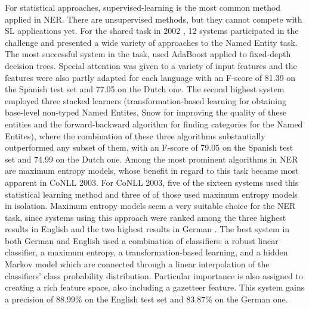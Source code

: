 \documentclass[11pt]{article}
\begin{document}
For statistical approaches, supervised-learning is the most common method applied in NER. 
There are unsupervised methods, but they cannot compete with SL applications yet.
For the shared task in 2002 \cite{tksintro}, 12 systems participated in the challenge and presented a wide variety of approaches to the Named Entity task.
The most successful system in the task, used AdaBoost applied to fixed-depth decision trees. Special attention was given to a variety of input features and the features were also
partly adapted for each language with an F-score of 81.39 on the Spanish test set and 77.05 on the Dutch one.
The second highest system \cite{Florian:2002:NER:1118853.1118863} employed three stacked
learners (transformation-based learning for obtaining base-level non-typed Named Entites, Snow for improving the quality of these entities and the forward-backward algorithm for
finding categories for the Named Entites), where the combination of these three algorithms substantially outperformed any subset of them, with an F-score of 79.05 on the Spanish test
set and 74.99 on the Dutch one.
Among the most prominent algorithms in NER are maximum entropy models, whose benefit in regard to this task became most apparent in CoNLL 2003. 
For CoNLL 2003, five of the sixteen systems used this statistical learning method and three of of those used maximum entropy models in isolation.
Maximum entropy models seem a very suitable choice for the NER task, since systems using this approach were ranked among the three highest results in 
English and the two highest results in German \cite{TjongKimSang:2003:ICS:1119176.1119195}.
The best system in both German and English \cite{Florian:2003:NER:1119176.1119201} used a combination of classifiers: a robust linear classifier, 
a maximum entropy, a transformation-based learning, and a hidden Markov model which are connected through a linear interpolation of the classifiers’ %
class probability distribution. Particular importance is also assigned to creating a rich feature space, also including a gazetteer feature. 
This system gains a precision of 88.99\% on the English test set and  83.87\% on the German one. 
\end{document}
